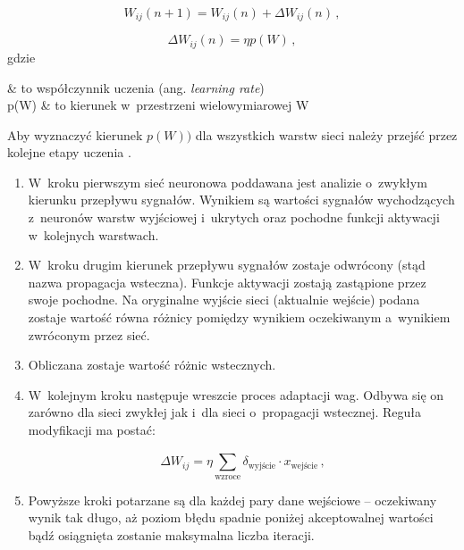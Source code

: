 \documentclass[twoside]{iisthesis}
\begin{document}
	 \begin{equation}
	 \label{eq:weightadaptation3}
	 W_{ij}(n+1) = W_{ij}(n) + \Delta W_{ij}(n) 
	 \,,
	 \end{equation}
	 
	 
	 \begin{equation}
	 \label{eq:weightadaptation2}
	 \Delta W_{ij}(n) = \eta p(W)
	 \,,
	 \end{equation}		 
	 gdzie
	 
	 \begin{conditions*}
			 	\eta & to współczynnik uczenia (ang. \textit{learning rate}) \\
			 	p(W) & to kierunek w~przestrzeni wielowymiarowej W~
	 \end{conditions*} 
	 
	 Aby wyznaczyć kierunek $p(W))$ dla wszystkich warstw sieci należy przejść przez kolejne etapy uczenia \cite{haykin1994neural,hertz1993wstkep,kwateralgorytmy,osowski1996sieci,timothy1996sieci}.
	 
	 \begin{enumerate}
			 	\item W~kroku pierwszym sieć neuronowa poddawana jest analizie o~zwykłym kierunku przepływu sygnałów. Wynikiem są wartości sygnałów wychodzących z~neuronów warstw wyjściowej i~ukrytych oraz pochodne funkcji aktywacji w~kolejnych warstwach. 
			 	
			 	\item W~kroku drugim kierunek przepływu sygnałów zostaje odwrócony (stąd nazwa propagacja wsteczna). Funkcje aktywacji zostają zastąpione przez swoje pochodne. Na oryginalne wyjście sieci (aktualnie wejście) podana zostaje wartość równa różnicy pomiędzy wynikiem oczekiwanym a~wynikiem zwróconym przez sieć. 
			 	
			 	\item Obliczana zostaje wartość różnic wstecznych.
			 	
			 	\item W~kolejnym kroku następuje wreszcie proces adaptacji wag. Odbywa się on zarówno dla sieci zwykłej jak i~dla sieci o~propagacji wstecznej. Reguła modyfikacji ma postać: 
			 	
			 	\begin{equation}
			 	\label{eq:weightadaptation4}
			 	\Delta W_{ij} = \eta \sum_\text{wzroce}^{} \delta_\text{wyjście} \cdot x_\text{wejście}
			 	\,,
			 	\end{equation}
			 	
			 	\item Powyższe kroki potarzane są dla każdej pary dane wejściowe -- oczekiwany wynik tak długo, aż poziom błędu spadnie poniżej akceptowalnej wartości bądź osiągnięta zostanie maksymalna liczba iteracji. 
			 	
	 \end{enumerate}
	 
\end{document}
